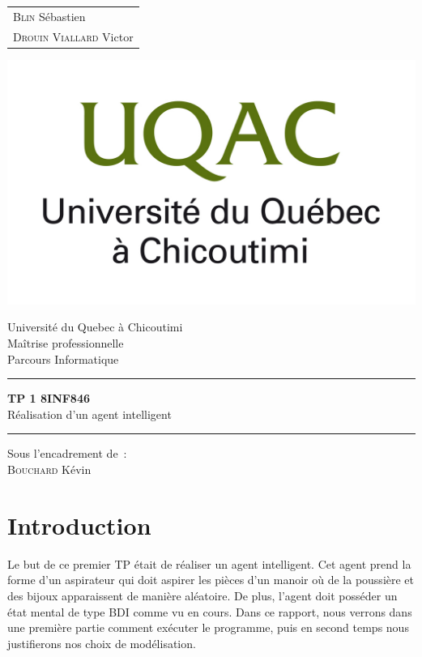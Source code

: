 \documentclass{article}
\begin{document}
\begin{titlepage}
	\vspace{-20px}
	\begin{tabular}{l}
		\textsc{Blin} Sébastien\\
		\textsc{Drouin Viallard} Victor
	\end{tabular}
	\hfill \vspace{10px}\includegraphics[scale=0.1]{uqac}\\
	\vfill
	\begin{center}
		\Huge{Université du Quebec à Chicoutimi}\\
		\vspace{1cm}
		\LARGE{Maîtrise professionnelle}\\
		\large{Parcours Informatique}\\
		\vspace{0.5cm}\hrule\vspace{0.5cm}
		\LARGE{\textbf{TP 1 8INF846}}\\
		\Large{Réalisation d'un agent intelligent}
		\vspace{0.5cm}\hrule
		\vfill
		\vfill
	\end{center}
	\begin{flushleft}
		\Large{Sous l'encadrement de~:}\\
		\vspace{0.2cm}
		\large{\textsc{Bouchard} Kévin}
	\end{flushleft}
	\vfill
\end{titlepage}

\section{Introduction}
Le but de ce premier TP était de réaliser un agent intelligent. Cet agent prend la forme d'un aspirateur qui doit aspirer les pièces d'un manoir où de la poussière et des bijoux apparaissent de manière aléatoire. De plus, l'agent doit posséder un état mental de type BDI comme vu en cours. Dans ce rapport, nous verrons dans une première partie comment exécuter le programme, puis en second temps nous justifierons nos choix de modélisation.
\end{document}
